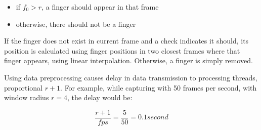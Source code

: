 \begin{itemize}
\item if $f_0 > r$, a finger should appear in that frame
\item otherwise, there should not be a finger
\end{itemize}

If the finger does not exist in current frame and a check indicates it should, its position is calculated using finger positions in two closest frames where that finger appears, using linear interpolation. Otherwise, a finger is simply removed.

Using data preprocessing causes delay in data transmission to processing threads, proportional $r+1$. For example, while capturing with 50 frames per second, with window radius $r=4$, the delay would be:

$$ \frac{r+1}{fps} = \frac{5}{50} = 0.1 second $$
